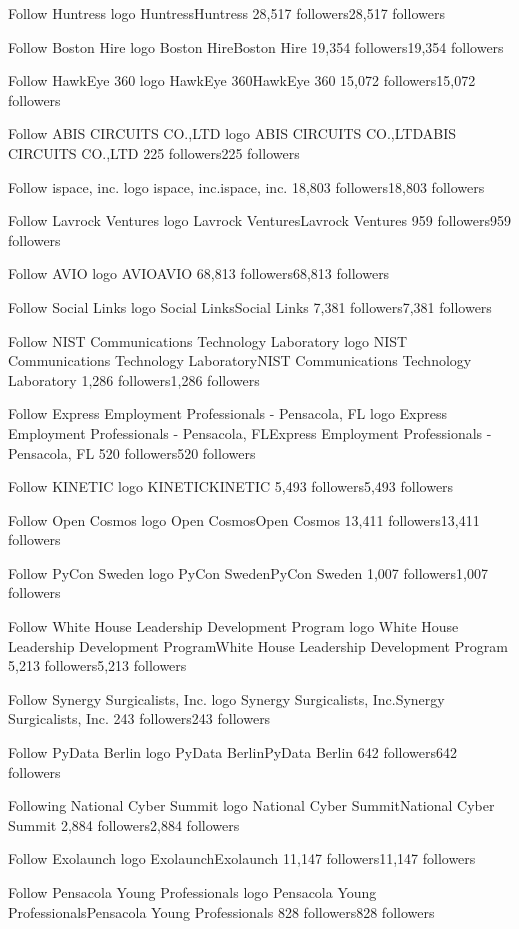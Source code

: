 Follow
Huntress logo
HuntressHuntress
28,517 followers28,517 followers

Follow
Boston Hire logo
Boston HireBoston Hire
19,354 followers19,354 followers

Follow
HawkEye 360 logo
HawkEye 360HawkEye 360
15,072 followers15,072 followers

Follow
ABIS CIRCUITS CO.,LTD logo
ABIS CIRCUITS CO.,LTDABIS CIRCUITS CO.,LTD
225 followers225 followers

Follow
ispace, inc. logo
ispace, inc.ispace, inc.
18,803 followers18,803 followers

Follow
Lavrock Ventures logo
Lavrock VenturesLavrock Ventures
959 followers959 followers

Follow
AVIO logo
AVIOAVIO
68,813 followers68,813 followers

Follow
Social Links logo
Social LinksSocial Links
7,381 followers7,381 followers

Follow
NIST Communications Technology Laboratory logo
NIST Communications Technology LaboratoryNIST Communications Technology Laboratory
1,286 followers1,286 followers

Follow
Express Employment Professionals - Pensacola, FL logo
Express Employment Professionals - Pensacola, FLExpress Employment Professionals - Pensacola, FL
520 followers520 followers

Follow
KINETIC logo
KINETICKINETIC
5,493 followers5,493 followers

Follow
Open Cosmos logo
Open CosmosOpen Cosmos
13,411 followers13,411 followers

Follow
PyCon Sweden logo
PyCon SwedenPyCon Sweden
1,007 followers1,007 followers

Follow
White House Leadership Development Program logo
White House Leadership Development ProgramWhite House Leadership Development Program
5,213 followers5,213 followers

Follow
Synergy Surgicalists, Inc. logo
Synergy Surgicalists, Inc.Synergy Surgicalists, Inc.
243 followers243 followers

Follow
PyData Berlin logo
PyData BerlinPyData Berlin
642 followers642 followers

Following
National Cyber Summit logo
National Cyber SummitNational Cyber Summit
2,884 followers2,884 followers

Follow
Exolaunch logo
ExolaunchExolaunch
11,147 followers11,147 followers

Follow
Pensacola Young Professionals logo
Pensacola Young ProfessionalsPensacola Young Professionals
828 followers828 followers

